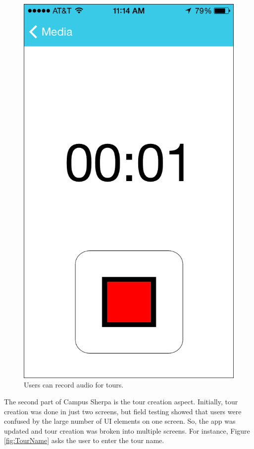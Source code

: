 \documentclass{sigchi}
\begin{document}
\begin{figure}
\centering
\includegraphics[width=0.7\linewidth]{./AudioRecord}
\caption{Users can record audio for tours.}
\label{fig:AudioRecord}
\end{figure}

The second part of Campus Sherpa is the tour creation aspect. Initially, tour creation was done in just two screens, but field testing showed that users were confused by the large number of UI elements on one screen. So, the app was updated and tour creation was broken into multiple screens. For instance, Figure \ref{fig:TourName} asks the user to enter the tour name.
\end{document}
